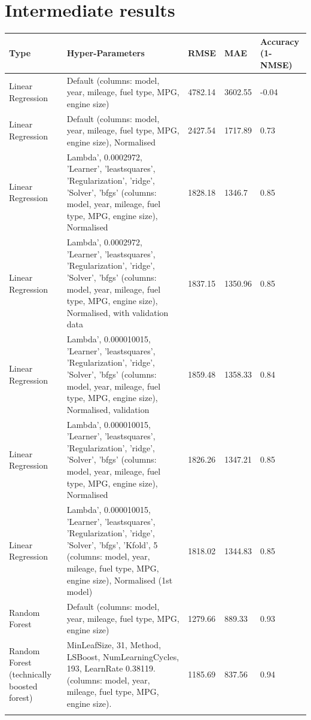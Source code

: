 \documentclass[a4paper,11pt]{article}
\begin{document}
\section{Intermediate results}
\begin{longtable}{m{3.5cm}m{6.5cm}m{1.5cm}m{1.5cm}m{1.5cm}}
\toprule
Type & Hyper-Parameters & RMSE & MAE & Accuracy (1-NMSE) \\
\midrule
Linear Regression & Default (columns: model, year, mileage, fuel type, MPG, engine size) & 4782.14 & 3602.55 & -0.04 \\
\addlinespace
Linear Regression & Default (columns: model, year, mileage, fuel type, MPG, engine size), Normalised & 2427.54 & 1717.89 & 0.73 \\
\addlinespace
Linear Regression & Lambda', 0.0002972, 'Learner', 'leastsquares', 'Regularization', 'ridge', 'Solver', 'bfgs' (columns: model, year, mileage, fuel type, MPG, engine size), Normalised & 1828.18 & 1346.7 & 0.85 \\
\addlinespace
Linear Regression & Lambda', 0.0002972, 'Learner', 'leastsquares', 'Regularization', 'ridge', 'Solver', 'bfgs' (columns: model, year, mileage, fuel type, MPG, engine size), Normalised, with validation data & 1837.15 & 1350.96 & 0.85 \\
\addlinespace
Linear Regression & Lambda', 0.000010015, 'Learner', 'leastsquares', 'Regularization', 'ridge', 'Solver', 'bfgs' (columns: model, year, mileage, fuel type, MPG, engine size), Normalised, validation & 1859.48 & 1358.33 & 0.84 \\
\addlinespace
Linear Regression & Lambda', 0.000010015, 'Learner', 'leastsquares', 'Regularization', 'ridge', 'Solver', 'bfgs' (columns: model, year, mileage, fuel type, MPG, engine size), Normalised & 1826.26 & 1347.21 & 0.85 \\
\addlinespace
Linear Regression & Lambda', 0.000010015, 'Learner', 'leastsquares', 'Regularization', 'ridge', 'Solver', 'bfgs', 'Kfold', 5 (columns: model, year, mileage, fuel type, MPG, engine size), Normalised (1st model) & 1818.02 & 1344.83 & 0.85 \\
\addlinespace
Random Forest & Default (columns: model, year, mileage, fuel type, MPG, engine size) & 1279.66 & 889.33 & 0.93 \\
\addlinespace
Random Forest (technically boosted forest) & MinLeafSize, 31, Method, LSBoost, NumLearningCycles, 193, LearnRate 0.38119. (columns: model, year, mileage, fuel type, MPG, engine size). & 1185.69 & 837.56 & 0.94 \\
\addlinespace

\end{longtable}
\end{document}
